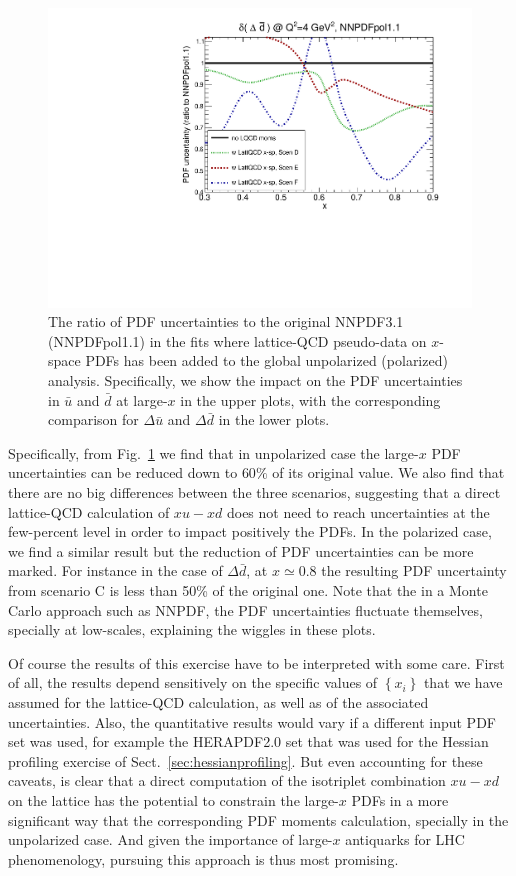 \begin{figure}[!t]
\includegraphics[scale=0.45]{plots/xdbar-pol-lattice-relerr-xdata-xspace.pdf}
\caption{\small The ratio of PDF uncertainties to the original
  NNPDF3.1 (NNPDFpol1.1) in the fits where lattice-QCD pseudo-data
  on $x$-space PDFs has been added to the global unpolarized
  (polarized) analysis.
  Specifically, we show the impact on the PDF uncertainties
  in $\bar{u}$ and $\bar{d}$ at large-$x$ in the upper
  plots, with the corresponding comparison for $\Delta\bar{u}$
  and $\Delta\bar{d}$ in the lower plots.
}    
\label{fig:impactxspace}
\end{figure}

Specifically, from Fig.~\ref{fig:impactxspace} we find that
in unpolarized case the large-$x$ PDF uncertainties can be reduced
down to $60\%$ of its original value.
%
We also find that there are no big differences between the three
scenarios, suggesting that a direct lattice-QCD calculation
of $x u-x d$ does not need to reach uncertainties
at the few-percent level in order to impact positively
the PDFs.
%
In the polarized case, we find a similar result but the reduction
of PDF uncertainties can be more marked.
%
For instance in the case of $\Delta \bar{d}$, at $x\simeq 0.8$
the resulting PDF uncertainty from scenario C is less than 50\%
of the original one.
%
Note that the in a Monte Carlo approach such as NNPDF, the
PDF uncertainties fluctuate themselves, specially at low-scales,
explaining the wiggles in these plots.

Of course the results of this exercise have to be interpreted
with some care.
%
First of all, the results depend sensitively on the specific values of
$\left\{ x_i \right\}$
that we have assumed for the lattice-QCD calculation,
as well as of the associated uncertainties.
%
Also, the quantitative results would vary if a different input PDF set
was used, for example the HERAPDF2.0 set that was used for
the Hessian profiling exercise of Sect.~\ref{sec:hessianprofiling}.
%
But even accounting for these caveats, is clear that a direct
computation of the isotriplet combination $x u-x d$ on the lattice
has the potential to constrain the large-$x$ PDFs in
a more significant way that the corresponding PDF moments calculation,
specially in the unpolarized case.
%
And given the importance of large-$x$ antiquarks for LHC phenomenology,
pursuing this approach is thus most promising.
